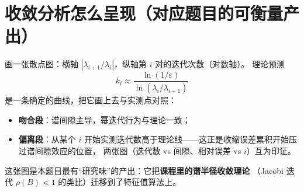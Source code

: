 \section{收敛分析怎么呈现（对应题目的可衡量产出）}

画一张散点图：横轴 $|\lambda_{i+1}/\lambda_i|$，纵轴第 $i$ 对的迭代次数（对数轴）。
理论预测
\[
k_i\approx\frac{\ln(1/\varepsilon)}{\ln(\lambda_i/\lambda_{i+1})}
\]
是一条确定的曲线，把它画上去与实测点对照：
\begin{itemize}
  \item \textbf{吻合段}：谱间隙主导，幂迭代行为与理论一致；
  \item \textbf{偏离段}：从某个 $i$ 开始实测迭代数高于理论线——这正是收缩误差累积开始压过谱间隙效应的位置，
  两张图（迭代数 vs 间隙、相对误差 vs $i$）互为印证。
\end{itemize}
这张图是本题目最有“研究味”的产出：它把\textbf{课程里的谱半径收敛理论}
（Jacobi 迭代 $\rho(B)<1$ 的类比）迁移到了特征值算法上。
